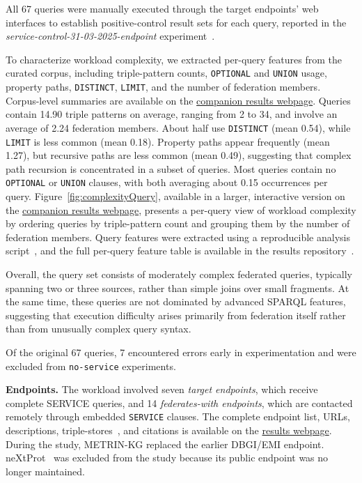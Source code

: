 \documentclass[runningheads]{llncs}
\begin{document}
All 67 queries were manually executed through the target endpoints' web interfaces to establish positive-control result sets for each query, reported in the \textit{service-control-31-03-2025-endpoint} experiment~\cite{fedSurveyResultsRepo}.

To characterize workload complexity, we extracted per-query features from the curated corpus, including triple-pattern counts, \texttt{OPTIONAL} and \texttt{UNION} usage, property paths, \texttt{DISTINCT}, \texttt{LIMIT}, and the number of federation members. 
Corpus-level summaries are available on the \href{https://ecrum19.github.io/fed-survey-results/}{companion results webpage}. 
Queries contain 14.90 triple patterns on average, ranging from 2 to 34, and involve an average of 2.24 federation members. 
About half use \texttt{DISTINCT} (mean 0.54), while \texttt{LIMIT} is less common (mean 0.18). 
Property paths appear frequently (mean 1.27), but recursive paths are less common (mean 0.49), suggesting that complex path recursion is concentrated in a subset of queries. 
Most queries contain no \texttt{OPTIONAL} or \texttt{UNION} clauses, with both averaging about 0.15 occurrences per query.
Figure~\ref{fig:complexityQuery}, available in a larger, interactive version on the \href{https://ecrum19.github.io/fed-survey-results/}{companion results webpage}, presents a per-query view of workload complexity by ordering queries by triple-pattern count and grouping them by the number of federation members.
Query features were extracted using a reproducible analysis script~\cite{queryAnalysisSibFederatedRepo}, and the full per-query feature table is available in the results repository~\cite{fedSurveyResultsRepo}.

Overall, the query set consists of moderately complex federated queries, typically spanning two or three sources, rather than simple joins over small fragments. 
At the same time, these queries are not dominated by advanced SPARQL features, suggesting that execution difficulty arises primarily from federation itself rather than from unusually complex query syntax.



Of the original 67 queries, 7 encountered errors early in experimentation and were excluded from \texttt{no-service} experiments.

\textbf{Endpoints.}
The workload involved seven \textit{target endpoints}, which receive complete \textsc{SERVICE} queries, and 14 \textit{federates-with endpoints}, which are contacted remotely through embedded \texttt{SERVICE} clauses. 
The complete endpoint list, URLs, descriptions, triple-stores~\cite{Erling2009VirtuosoRDF,bast2017qlever}, and citations is available on the \href{https://ecrum19.github.io/fed-survey-results/}{results webpage}. 
During the study, METRIN-KG replaced the earlier DBGI/EMI endpoint.
neXtProt~\cite{ZahnZabal2020neXtProt} was excluded from the study because its public endpoint was no longer maintained.
\end{document}
